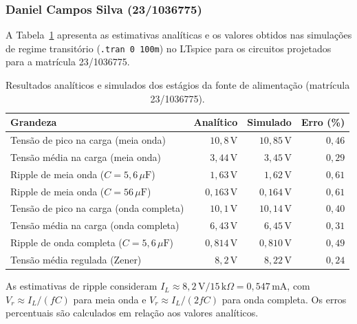 \documentclass[11pt,a4paper]{article}
\begin{document}
\subsubsection{Daniel Campos Silva (23/1036775)}

A Tabela~\ref{tab:resultados_daniel} apresenta as estimativas analíticas e os valores obtidos nas simulações de regime transitório (\texttt{.tran 0 100m}) no LTspice para os circuitos projetados para a matrícula 23/1036775.

\begin{table}[H]
    \centering
    \caption{Resultados analíticos e simulados dos estágios da fonte de alimentação (matrícula 23/1036775).}
    \label{tab:resultados_daniel}
    \renewcommand{\arraystretch}{1.2}
    \begin{tabular}{@{}lrrr@{}}
        \toprule
        \textbf{Grandeza} & \textbf{Analítico} & \textbf{Simulado} & \textbf{Erro (\%)} \\
        \midrule
        Tensão de pico na carga (meia onda)
        & $10{,}8\,\text{V}$ & $10{,}85\,\text{V}$ & $0{,}46$ \\

        Tensão média na carga (meia onda)
        & $3{,}44\,\text{V}$ & $3{,}45\,\text{V}$ & $0{,}29$ \\

        Ripple de meia onda ($C=5{,}6\,\mu\text{F}$)
        & $1{,}63\,\text{V}$ & $1{,}62\,\text{V}$ & $0{,}61$ \\

        Ripple de meia onda ($C=56\,\mu\text{F}$)
        & $0{,}163\,\text{V}$ & $0{,}164\,\text{V}$ & $0{,}61$ \\

        Tensão de pico na carga (onda completa)
        & $10{,}1\,\text{V}$ & $10{,}14\,\text{V}$ & $0{,}40$ \\

        Tensão média na carga (onda completa)
        & $6{,}43\,\text{V}$ & $6{,}45\,\text{V}$ & $0{,}31$ \\

        Ripple de onda completa ($C=5{,}6\,\mu\text{F}$)
        & $0{,}814\,\text{V}$ & $0{,}810\,\text{V}$ & $0{,}49$ \\

        Tensão média regulada (Zener)
        & $8{,}2\,\text{V}$ & $8{,}22\,\text{V}$ & $0{,}24$ \\
        \bottomrule
    \end{tabular}

    \vspace{3pt}
    \begin{minipage}{0.95\linewidth}
        \footnotesize
        As estimativas de ripple consideram
        $I_L\approx 8{,}2\,\text{V}/15\,\text{k}\Omega
        =0{,}547\,\text{mA}$, com
        $V_r\approx I_L/(fC)$ para meia onda e
        $V_r\approx I_L/(2fC)$ para onda completa.
        Os erros percentuais são calculados em relação aos valores analíticos.
    \end{minipage}
\end{table}
\end{document}
